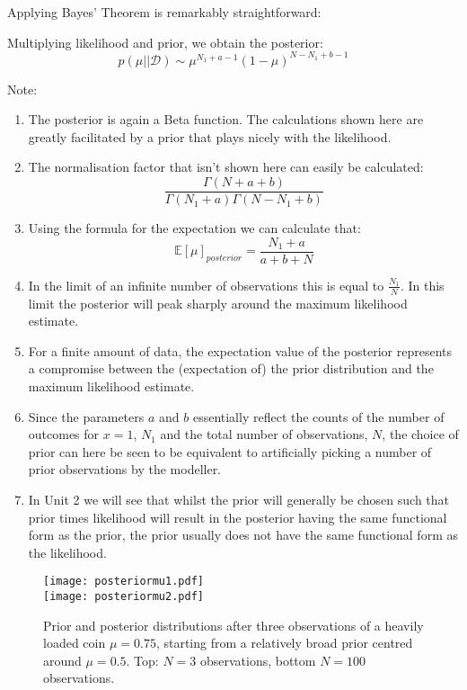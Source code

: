 Applying Bayes' Theorem is remarkably straightforward:

Multiplying likelihood and prior, we obtain the posterior:
$$
p(\mu | \mid \mathcal{D} ) \sim \mu^{N_1 + a -1} ( 1 - \mu)^{N-N_1 + b - 1}
$$

Note:
\begin{enumerate}
\item The posterior is again a Beta function. The calculations shown here are greatly facilitated by a prior that plays nicely with the likelihood.
\item  The normalisation factor that isn't shown here can easily be calculated:
$$
\frac{\Gamma(N +a + b )}{\Gamma(N_1 + a ) \Gamma(N - N_1 + b )}
$$

\item  Using the formula for the expectation we can calculate that:
$$
\mathbb E[{\mu}]_{posterior} = \frac{N_1 + a}{a + b + N}
$$

\item In the limit of an infinite number of observations this is equal to $\frac{N_1}{N}$. In this limit the posterior will peak sharply around the maximum likelihood estimate.

\item For a finite amount of data, the expectation value of the posterior represents a compromise between the
(expectation of) the prior distribution and the maximum likelihood estimate.

\item  Since the parameters $a$ and $b$ essentially reflect the counts of the number of outcomes for $x=1$, $N_1$ and the total number of observations, $N$, the choice of prior can here be seen to be equivalent to artificially picking a number of prior observations by the modeller.

\item In Unit 2 we will  see that whilst the prior will generally be chosen such that prior times likelihood will result in the posterior having the same functional form as the prior, the prior usually does not have the same functional form as the likelihood.
\end{enumerate}

\begin{figure}
  \begin{center}
    \texttt{[image: posteriormu1.pdf]} \\
    \texttt{[image: posteriormu2.pdf]} \\
  \end{center}
  \caption{Prior and posterior distributions after three observations of a heavily loaded coin $\mu = 0.75$, starting from a relatively broad prior centred around $\mu = 0.5$. Top: $N= 3$ observations, bottom $N=100$ observations.}
  \label{fig-postmu}
\end{figure}

